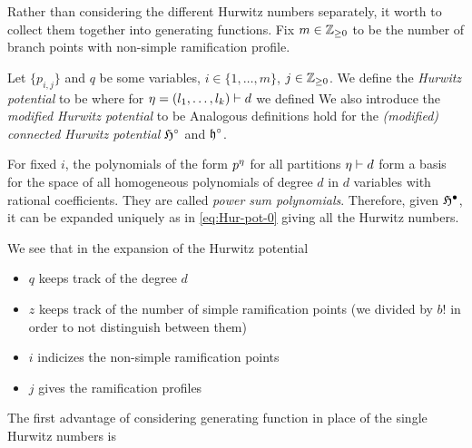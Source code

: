 \documentclass[10pt]{beamer}
\begin{document}
\begin{frame}

Rather than considering the different Hurwitz numbers separately, it worth to collect them together into generating functions. Fix $m\in\mathbb Z_{\geq0}$ to be the number of branch points with non-simple ramification profile.

\begin{definition}
	Let $\{p_{i,j}\}$ and $q$ be some variables, $i\in\{1,\ldots,m\}$, $j\in\mathbb Z_{\geq0}$. We define the \emph{Hurwitz potential} to be
	where for $\eta=(l_1,\ldots,l_k)\vdash d$ we defined
	We also introduce the \emph{modified Hurwitz potential} to be
	\vspace{-2pt}
	Analogous definitions hold for the \emph{(modified) connected Hurwitz potential} $\mathfrak H^\circ$ and $\mathfrak h^\circ$. 
\end{definition}

\end{frame}

\begin{frame}

For fixed $i$, the polynomials of the form $p^\eta$ for all partitions $\eta\vdash d$ form a basis for the space of all homogeneous polynomials of degree $d$ in $d$ variables with rational coefficients. They are called \emph{power sum polynomials}. Therefore, given $\mathfrak H^\bullet$, it can be expanded uniquely as in \eqref{eq:Hur-pot-0} giving all the Hurwitz numbers. 

We see that in the expansion of the Hurwitz potential
\begin{itemize}
	\item $q$ keeps track of the degree $d$
	\item $z$ keeps track of the number of simple ramification points (we divided by $b!$ in order to not distinguish between them)
	\item $i$ indicizes the non-simple ramification points
	\item $j$ gives the ramification profiles
\end{itemize}

The first advantage of considering generating function in place of the single Hurwitz numbers is 

\begin{theorem}
	\vspace{-5pt}
\end{theorem}

\end{frame}
\end{document}
